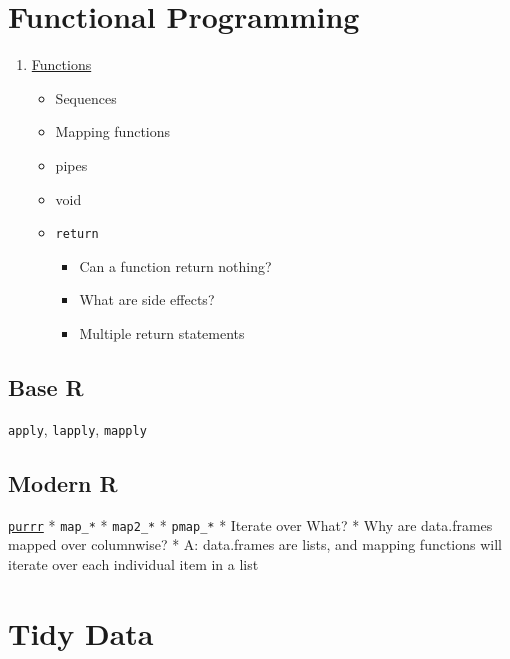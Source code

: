 \documentclass[
]{book}
\providecommand{\tightlist}{%
  \setlength{\itemsep}{0pt}\setlength{\parskip}{0pt}}
\begin{document}
\hypertarget{functional-programming}{%
\chapter{Functional Programming}\label{functional-programming}}

\begin{enumerate}
\def\labelenumi{\arabic{enumi}.}
\setcounter{enumi}{1}
\tightlist
\item
  \href{https://hackmd.io/R_cVl-DBSve03vc1trHrGw}{Functions}

  \begin{itemize}
  \tightlist
  \item
    Sequences
  \item
    Mapping functions
  \item
    pipes
  \item
    void
  \item
    \texttt{return}

    \begin{itemize}
    \tightlist
    \item
      Can a function return nothing?
    \item
      What are side effects?
    \item
      Multiple return statements
    \end{itemize}
  \end{itemize}
\end{enumerate}

\hypertarget{base-r}{%
\section{Base R}\label{base-r}}

\texttt{apply}, \texttt{lapply}, \texttt{mapply}

\hypertarget{modern-r}{%
\section{Modern R}\label{modern-r}}

\href{https://raw.githubusercontent.com/rstudio/cheatsheets/main/purrr.pdf}{\texttt{purrr}}
* \texttt{map\_*}
* \texttt{map2\_*}
* \texttt{pmap\_*}
* Iterate over What?
* Why are data.frames mapped over columnwise?
* A: data.frames are lists, and mapping functions will iterate over each individual item in a list

\hypertarget{tidy-data}{%
\chapter{Tidy Data}\label{tidy-data}}
\end{document}
